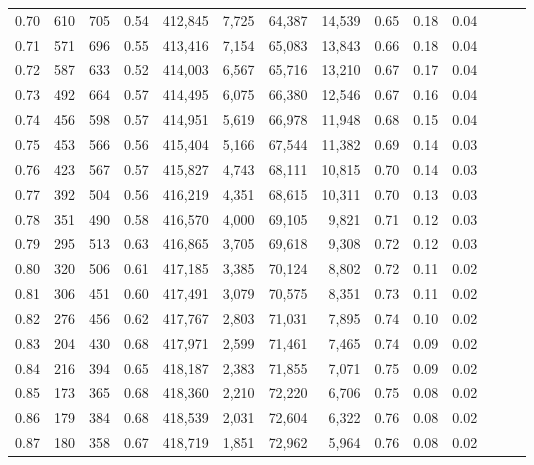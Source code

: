 \begin{tabular}{rrrrrrrrrrrrrr}
0.70 &     610 &    705 &  0.54 &  412,845 &    7,725 &  64,387 &  14,539 &  0.65 &  0.18 &      0.04 \\
0.71 &     571 &    696 &  0.55 &  413,416 &    7,154 &  65,083 &  13,843 &  0.66 &  0.18 &      0.04 \\
0.72 &     587 &    633 &  0.52 &  414,003 &    6,567 &  65,716 &  13,210 &  0.67 &  0.17 &      0.04 \\
0.73 &     492 &    664 &  0.57 &  414,495 &    6,075 &  66,380 &  12,546 &  0.67 &  0.16 &      0.04 \\
0.74 &     456 &    598 &  0.57 &  414,951 &    5,619 &  66,978 &  11,948 &  0.68 &  0.15 &      0.04 \\
0.75 &     453 &    566 &  0.56 &  415,404 &    5,166 &  67,544 &  11,382 &  0.69 &  0.14 &      0.03 \\
0.76 &     423 &    567 &  0.57 &  415,827 &    4,743 &  68,111 &  10,815 &  0.70 &  0.14 &      0.03 \\
0.77 &     392 &    504 &  0.56 &  416,219 &    4,351 &  68,615 &  10,311 &  0.70 &  0.13 &      0.03 \\
0.78 &     351 &    490 &  0.58 &  416,570 &    4,000 &  69,105 &   9,821 &  0.71 &  0.12 &      0.03 \\
0.79 &     295 &    513 &  0.63 &  416,865 &    3,705 &  69,618 &   9,308 &  0.72 &  0.12 &      0.03 \\
0.80 &     320 &    506 &  0.61 &  417,185 &    3,385 &  70,124 &   8,802 &  0.72 &  0.11 &      0.02 \\
0.81 &     306 &    451 &  0.60 &  417,491 &    3,079 &  70,575 &   8,351 &  0.73 &  0.11 &      0.02 \\
0.82 &     276 &    456 &  0.62 &  417,767 &    2,803 &  71,031 &   7,895 &  0.74 &  0.10 &      0.02 \\
0.83 &     204 &    430 &  0.68 &  417,971 &    2,599 &  71,461 &   7,465 &  0.74 &  0.09 &      0.02 \\
0.84 &     216 &    394 &  0.65 &  418,187 &    2,383 &  71,855 &   7,071 &  0.75 &  0.09 &      0.02 \\
0.85 &     173 &    365 &  0.68 &  418,360 &    2,210 &  72,220 &   6,706 &  0.75 &  0.08 &      0.02 \\
0.86 &     179 &    384 &  0.68 &  418,539 &    2,031 &  72,604 &   6,322 &  0.76 &  0.08 &      0.02 \\
0.87 &     180 &    358 &  0.67 &  418,719 &    1,851 &  72,962 &   5,964 &  0.76 &  0.08 &      0.02 \\

\end{tabular}
